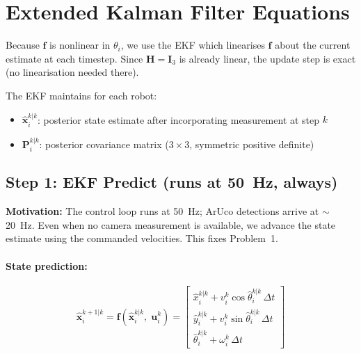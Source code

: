 \documentclass[12pt,a4paper]{article}
\begin{document}
\section{Extended Kalman Filter Equations}
\label{sec:ekf}

Because $\bm{f}$ is nonlinear in $\theta_i$, we use the EKF which linearises $\bm{f}$
about the current estimate at each timestep. Since $\bm{H} = \bm{I}_3$ is already
linear, the update step is exact (no linearisation needed there).

The EKF maintains for each robot:
\begin{itemize}
  \item $\hat{\bm{x}}_i^{k|k}$: posterior state estimate after incorporating measurement at step $k$
  \item $\bm{P}_i^{k|k}$: posterior covariance matrix ($3\times 3$, symmetric positive definite)
\end{itemize}

\subsection{Step 1: EKF Predict (runs at 50~Hz, always)}
\label{sec:predict}

\textbf{Motivation:} The control loop runs at 50~Hz; ArUco detections arrive at
$\sim$20~Hz. Even when no camera measurement is available, we advance the state
estimate using the commanded velocities. This fixes Problem~1.

\paragraph{State prediction:}
\begin{mathbox}
\begin{equation}
  \hat{\bm{x}}_i^{k+1|k} = \bm{f}\!\left(\hat{\bm{x}}_i^{k|k},\; \bm{u}_i^k\right)
  = \begin{bmatrix}
      \hat{x}_i^{k|k} + v_i^k \cos\hat{\theta}_i^{k|k} \, \Delta t \\
      \hat{y}_i^{k|k} + v_i^k \sin\hat{\theta}_i^{k|k} \, \Delta t \\
      \hat{\theta}_i^{k|k} + \omega_i^k \, \Delta t
    \end{bmatrix}
  \label{eq:pred_state}
\end{equation}
\end{mathbox}
\end{document}
